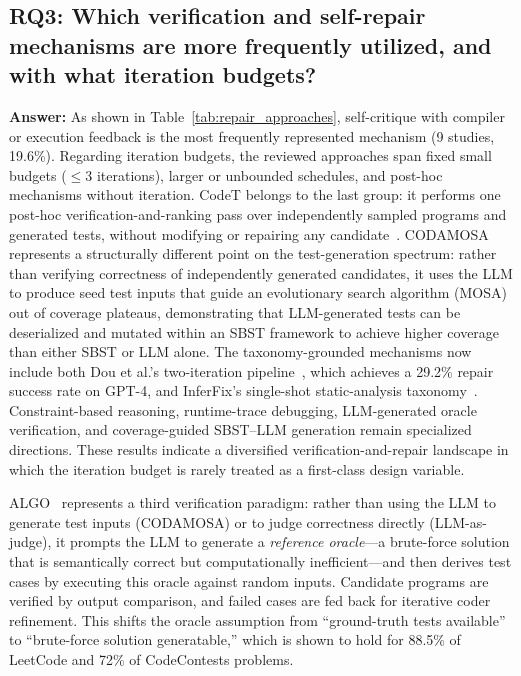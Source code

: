\documentclass[10pt,a4paper]{article}
\begin{document}
\subsection*{RQ3: Which verification and self-repair mechanisms are more frequently utilized, and with what iteration budgets?}
\textbf{Answer:} As shown in Table~\ref{tab:repair_approaches}, self-critique with compiler or execution feedback is the most frequently represented mechanism (9 studies, 19.6\%). Regarding iteration budgets, the reviewed approaches span fixed small budgets ($\leq$3 iterations), larger or unbounded schedules, and post-hoc mechanisms without iteration. CodeT belongs to the last group: it performs one post-hoc verification-and-ranking pass over independently sampled programs and generated tests, without modifying or repairing any candidate~\cite{chenbei2023}. CODAMOSA~\cite{lemieux2023codamosa} represents a structurally different point on the test-generation spectrum: rather than verifying correctness of independently generated candidates, it uses the LLM to produce seed test inputs that guide an evolutionary search algorithm (MOSA) out of coverage plateaus, demonstrating that LLM-generated tests can be deserialized and mutated within an SBST framework to achieve higher coverage than either SBST or LLM alone. The taxonomy-grounded mechanisms now include both Dou et al.'s two-iteration pipeline~\cite{dou2026}, which achieves a 29.2\% repair success rate on GPT-4, and InferFix's single-shot static-analysis taxonomy~\cite{jin2023inferfix}. Constraint-based reasoning, runtime-trace debugging, LLM-generated oracle verification, and coverage-guided SBST--LLM generation remain specialized directions. These results indicate a diversified verification-and-repair landscape in which the iteration budget is rarely treated as a first-class design variable.

ALGO~\cite{zhang2023algo} represents a third verification paradigm: rather than using the LLM to generate test inputs (CODAMOSA) or to judge correctness directly (LLM-as-judge), it prompts the LLM to generate a \textit{reference oracle}---a brute-force solution that is semantically correct but computationally inefficient---and then derives test cases by executing this oracle against random inputs. Candidate programs are verified by output comparison, and failed cases are fed back for iterative coder refinement. This shifts the oracle assumption from ``ground-truth tests available'' to ``brute-force solution generatable,'' which is shown to hold for 88.5\% of LeetCode and 72\% of CodeContests problems.
\end{document}
